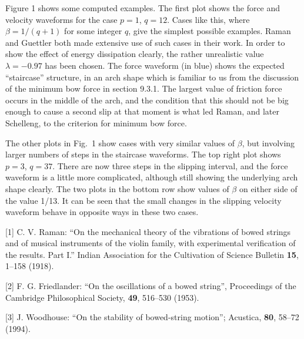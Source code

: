   Figure 1 shows some computed examples. The first plot shows the force and 
  velocity waveforms for the case $p=1$, $q=12$. Cases like this, where 
  $\beta=1/(q+1)$ for some integer $q$, give the simplest possible examples. 
  Raman and Guettler both made extensive use of such cases in their work. In 
  order to show the effect of energy dissipation clearly, the rather 
  unrealistic value $\lambda=-0.97$ has been chosen. The force waveform (in 
  blue) shows the expected ``staircase'' structure, in an arch shape which is 
  familiar to us from the discussion of the minimum bow force in section 9.3.1. 
  The largest value of friction force occurs in the middle of the arch, and the 
  condition that this should not be big enough to cause a second slip at that 
  moment is what led Raman, and later Schelleng, to the criterion for minimum 
  bow force. 





  The other plots in Fig.\ 1 show cases with very similar values of $\beta$, 
  but involving larger numbers of steps in the staircase waveforms. The top 
  right plot shows $p=3$, $q=37$. There are now three steps in the slipping 
  interval, and the force waveform is a little more complicated, although still 
  showing the underlying arch shape clearly. The two plots in the bottom row 
  show values of $\beta$ on either side of the value 1/13. It can be seen that 
  the small changes in the slipping velocity waveform behave in opposite ways 
  in these two cases. 

  \sectionreferences{}[1] C. V. Raman: ``On the mechanical theory of the 
  vibrations of bowed strings and of musical instruments of the violin family, 
  with experimental verification of the results. Part I.'' Indian Association 
  for the Cultivation of Science Bulletin \textbf{15}, 1–158 (1918). 

  [2] F. G. Friedlander: ``On the oscillations of a bowed string'', Proceedings 
  of the Cambridge Philosophical Society, \textbf{49}, 516--530 (1953). 

  [3] J. Woodhouse: ``On the stability of bowed-string motion''; Acustica, 
  \textbf{80}, 58--72 (1994). 